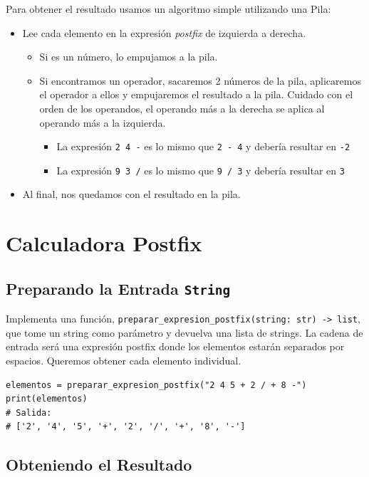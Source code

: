 \documentclass[10pt,a4paper]{article}
\begin{document}
\vspace{1cm}
Para obtener el resultado usamos un algoritmo simple utilizando una Pila:
\begin{itemize}
\item Lee cada elemento en la expresión \textit{postfix} de izquierda a derecha.
    \begin{itemize}
    \item Si es un número, lo empujamos a la pila.
    \item Si encontramos un operador, sacaremos 2 números de la pila, aplicaremos el operador a ellos y empujaremos el resultado a la pila. Cuidado con el orden de los operandos, el operando más a la derecha se aplica al operando más a la izquierda.
        \begin{itemize}
        \item[$\circ$] La expresión \texttt{2 4 -} es lo mismo que \texttt{2 - 4} y debería resultar en \texttt{-2}
        \item[$\circ$] La expresión \texttt{9 3 /} es lo mismo que \texttt{9 / 3} y debería resultar en \texttt{3}
        \end{itemize}
    \end{itemize}
\item Al final, nos quedamos con el resultado en la pila.
\end{itemize}

\newpage

\section{Calculadora Postfix}

\subsection{Preparando la Entrada \lstinline|String|}

Implementa una función, \lstinline|preparar_expresion_postfix(string: str) -> list|, que tome un string como parámetro y devuelva una lista de strings. La cadena de entrada será una expresión postfix donde los elementos estarán separados por espacios. Queremos obtener cada elemento individual.
\begin{lstlisting}
elementos = preparar_expresion_postfix("2 4 5 + 2 / + 8 -")
print(elementos)
# Salida:
# ['2', '4', '5', '+', '2', '/', '+', '8', '-']
\end{lstlisting}

\subsection{Obteniendo el Resultado}
\end{document}
